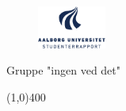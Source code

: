 \clearpage
\thispagestyle{empty}

\begin{figure}[H]
	\raggedleft
		\includegraphics[width=0.2\textwidth]{figures/aaulogo-da.png}
\end{figure} 
\vspace*{\fill} 
\begin{center}	
{\Large Gruppe "ingen ved det"}
\end{center}
\vspace*{\fill}

\begin{center}
\line(1,0){400}
\end{center}
